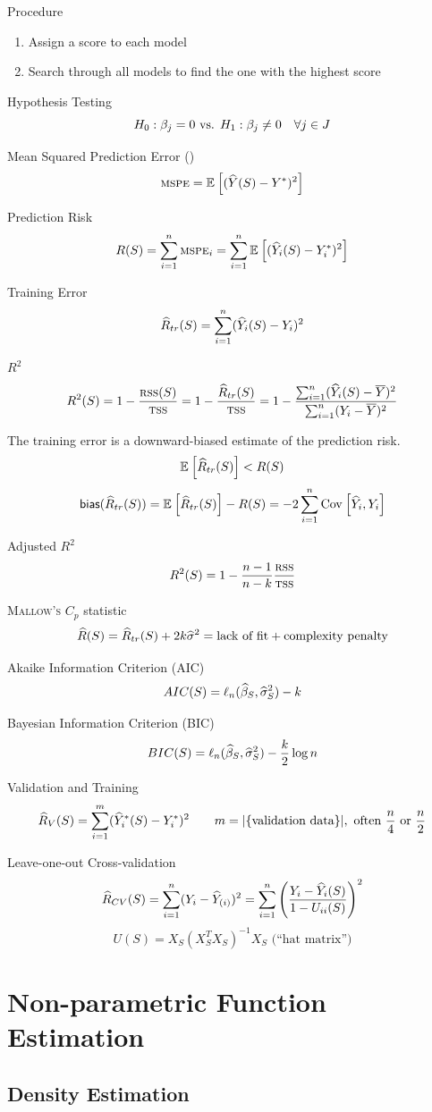 \documentclass[landscape]{article}
\begin{document}
\begin{multicols*}{2}
Procedure
\begin{enumerate}
  \item Assign a score to each model
  \item Search through all models to find the one with the highest score
\end{enumerate}

Hypothesis Testing
$$\hyp{\beta_j=0}{\beta_j\neq0} \quad\forall j \in J$$

Mean Squared Prediction Error (\mspe)
$$\textsc{mspe} = \mathbb{E}_{}\left[(\widehat{Y}(S)-Y^*)^2\right]$$

Prediction Risk
$$R(S) = \sum_{i=1}^n \textsc{mspe}_i = \sum_{i=1}^n \mathbb{E}_{}\left[(\widehat{Y}_i(S)-Y_i^*)^2\right]$$

Training Error
$$\widehat{R}_{tr}(S) = \sum_{i=1}^n(\widehat{Y}_i(S)-Y_i)^2$$

$R^2$
$$R^2(S) 
= 1 - \frac{\textsc{rss}(S)}{\textsc{tss}} 
= 1 - \frac{\widehat{R}_{tr}(S)}{\textsc{tss}}
= 1 - \frac{\sum_{i=1}^n(\widehat{Y}_i(S)-\overline{Y})^2}{\sum_{i=1}^n(Y_i-\overline{Y})^2}$$

The training error is a downward-biased estimate of the prediction risk.
$$\mathbb{E}_{}\left[\widehat{R}_{tr}(S)\right] < R(S)$$
$$\textsf{bias}(\widehat{R}_{tr}(S)) = \mathbb{E}_{}\left[\widehat{R}_{tr}(S)\right] - R(S) = -2\sum_{i=1}^n\mathrm{Cov}_{}\left[\widehat{Y}_i,Y_i\right]$$

Adjusted $R^2$
$$R^2(S) = 1 - \frac{n-1}{n-k} \frac{\textsc{rss}}{\textsc{tss}}$$

\textsc{Mallow's} $C_p$ statistic
$$\widehat{R}(S) = \widehat{R}_{tr}(S) + 2k\widehat{\sigma}^2 
= \text{lack of fit} + \text{complexity penalty}$$

Akaike Information Criterion (AIC)
$$AIC(S) = \ell_n(\widehat{\beta}_S, \widehat{\sigma}^2_S) - k$$

Bayesian Information Criterion (BIC)
$$BIC(S) = \ell_n(\widehat{\beta}_S, \widehat{\sigma}^2_S) - \frac{k}{2}\log n$$

Validation and Training
$$\widehat{R}_V(S) = \sum_{i=1}^m(\widehat{Y}_i^*(S) - Y_i^*)^2 \qquad
m = |\{\text{validation data}\}|, 
\text{ often }\frac{n}{4}\text { or }\frac{n}{2}$$

Leave-one-out Cross-validation
$$\widehat{R}_{CV}(S) 
= \sum_{i=1}^n(Y_i - \widehat{Y}_{(i)})^2 
= \sum_{i=1}^n \left( \frac{Y_i-\widehat{Y}_i(S)}{1-U_{ii}(S)} \right)^2$$
$$U(S) = X_S(X_S^T X_S)^{-1} X_S \text{ (``hat matrix'')}$$

\section{Non-parametric Function Estimation}

\subsection{Density Estimation}


\end{multicols*}
\end{document}
